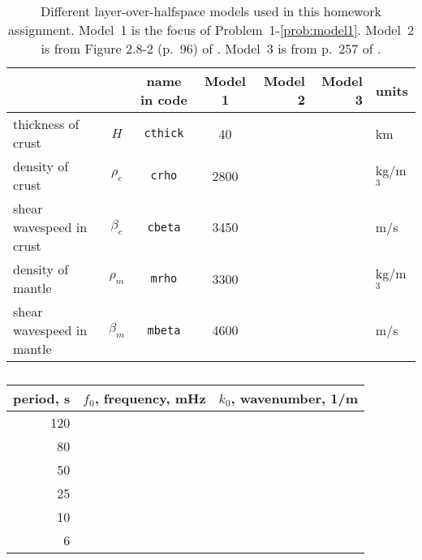 \documentclass[11pt,titlepage,fleqn]{article}
\begin{document}
\begin{table}
\vspace{-3cm}
\centering
\caption[]
{{
Different layer-over-halfspace models used in this homework assignment.
Model~1 is the focus of Problem~1-\ref{prob:model1}.
Model~2 is from  Figure 2.8-2 (p.~96) of \citet{SteinWysession}.
Model~3 is from p.~257 of \citet{AkiRichardsE2}.
\label{tab:models}
}}
\begin{spacing}{1.5}
\begin{tabular}{||l|c|c|c|r|r|l||}
\hline\hline
& & name in code & Model 1 & Model 2 & Model 3 & units \\
\hline\hline
thickness of crust        & $H$       & \verb+cthick+  & 40   & & & km       \\ \hline
density of crust          & $\rho_c$  & \verb+crho+    & 2800 & & & kg/m$^3$ \\ \hline
shear wavespeed in crust  & $\beta_c$ & \verb+cbeta+   & 3450 & & & m/s      \\ \hline
density of mantle         & $\rho_m$  & \verb+mrho+    & 3300 & & & kg/m$^3$ \\ \hline
shear wavespeed in mantle & $\beta_m$ & \verb+mbeta+   & 4600 & & & m/s      \\
\hline\hline
\end{tabular}
\end{spacing}
\end{table}

\begin{table}
\vspace{-5cm}
\centering
\caption[]
{{
\label{tab:k0}
}}
\begin{spacing}{1.5}
\begin{tabular}{r|r|r}
\hline\hline
period, s & $f_0$, frequency, mHz & $k_0$, wavenumber, 1/m  \\ \hline\hline
120 & & \\ \hline
80 & & \\ \hline
50 & &  \\ \hline
25 & & \\ \hline
10 & & \\ \hline
6 & &  \\ \hline
\end{tabular}
\end{spacing}
\end{table}
\end{document}
